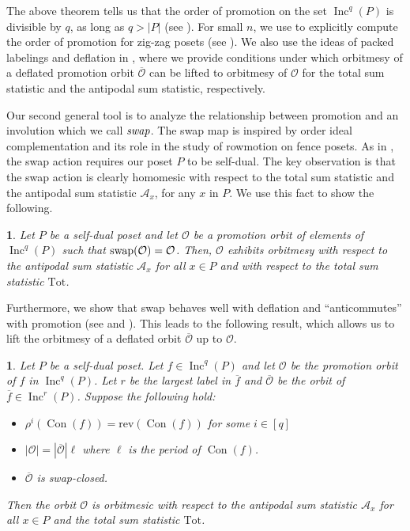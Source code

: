 \documentclass[11pt]{amsart}
\newtheorem*{thmc}{\Cref{thm:swap_orbitmesy}}
\newtheorem*{thmd}{\Cref{cor:swap-deflation-orbitmesy}}
\theoremstyle{definition}
\newcommand{\as}{\mathcal{A}}
\newcommand{\tot}{\mathrm{Tot}}
\newcommand{\rev}{\mathrm{rev}}
\DeclareMathOperator{\Inc}{\mathrm{Inc}}
\DeclareMathOperator{\Con}{\mathrm{Con}}
\newcommand{\swap}{\textnormal{swap}}
\begin{document}
The above theorem tells us that the order of promotion on the set $\Inc^q(P)$ is divisible by $q$, as long as $q>|P|$ (see ).
For small $n$, we use  to explicitly compute the order of promotion for zig-zag posets (see ).
We also use the ideas of packed labelings and deflation in , where we provide conditions under which orbitmesy of a deflated promotion orbit $\overline{\mathcal{O}}$ can be lifted to orbitmesy of $\mathcal{O}$ for the total sum statistic and the antipodal sum statistic, respectively.

Our second general tool is to analyze the relationship between promotion and an involution which we call $\emph{swap}$.
The swap map is inspired by order ideal complementation and its role in the study of rowmotion on fence posets.
As in \cite{elizalde2021rowmotion}, the swap action requires our poset $P$ to be self-dual.
The key observation is that the swap action is clearly homomesic with respect to the total sum statistic and the antipodal sum statistic $\mathcal{A}_x$, for any $x$ in $P$.
We use this fact to show the following.

\begin{thmc}
Let $P$ be a self-dual poset and let $\mathcal{O}$ be a promotion orbit of elements of $\Inc^q(P)$ such that $\swap(\mathcal{O}) = \mathcal{O}$. Then, $\mathcal{O}$ exhibits orbitmesy with respect to the antipodal sum statistic $\mathcal{A}_x$ for all $x \in P$ and with respect to the total sum statistic $\tot$.
\end{thmc}

Furthermore, we show that swap behaves well with deflation and ``anticommutes'' with promotion (see  and ).
This leads to the following result, which allows us to  lift the orbitmesy of a deflated orbit $\overline{\mathcal{O}}$ up to $\mathcal{O}$.

\begin{thmd}
    Let $P$ be a self-dual poset.  Let $f\in\Inc^q(P)$ and let $\mathcal{O}$ be the promotion orbit of $f$ in $\Inc^q(P)$.  Let $r$ be the largest label in $\overline{f}$ and $\overline{\mathcal{O}}$ be the orbit of $\overline{f}\in\Inc^r(P)$.  Suppose the following hold:
    \begin{itemize}
        \item $\rho^i(\Con(f))=\rev(\Con(f))$ for some $i\in[q]$
        \item $|\mathcal{O}|=|\overline{\mathcal{O}}| \ell$ where $\ell$ is the period of $\Con(f)$.
        \item $\overline{\mathcal{O}}$ is swap-closed.
    \end{itemize}
    Then the orbit $\mathcal{O}$ is orbitmesic with respect to the antipodal sum statistic $\as_x$ for all $x\in P$ and the total sum statistic $\tot$.

\end{thmd}
\end{document}
